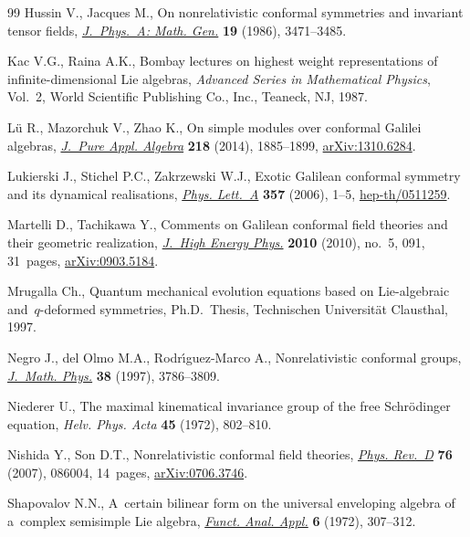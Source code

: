 \documentclass[pdftex]{sigma}
\numberwithin{equation}{section}
\begin{document}
\begin{thebibliography}{99}
Hussin V., Jacques M., On nonrelativistic conformal symmetries and invariant tensor f\/ields,
\href{http://dx.doi.org/10.1088/0305-4470/19/17/014}{\textit{J.~Phys.~A: Math. Gen.}} \textbf{19} (1986), 3471--3485.

Kac V.G., Raina A.K., Bombay lectures on highest weight representations of inf\/inite-dimensional {L}ie algebras,
\textit{Advanced Series in Mathematical Physics}, Vol.~2, World Scientif\/ic Publishing Co., Inc., Teaneck, NJ, 1987.

L{\"u} R., Mazorchuk V., Zhao K., On simple modules over conformal {G}alilei algebras,
\href{http://dx.doi.org/10.1016/j.jpaa.2014.02.012}{\textit{J.~Pure Appl. Algebra}} \textbf{218} (2014), 1885--1899, \href{http://arxiv.org/abs/1310.6284}{arXiv:1310.6284}.

Lukierski J., Stichel P.C., Zakrzewski W.J., Exotic {G}alilean conformal symmetry and its dynamical realisations,
\href{http://dx.doi.org/10.1016/j.physleta.2006.04.016}{\textit{Phys. Lett.~A}} \textbf{357} (2006), 1--5, \href{http://arxiv.org/abs/hep-th/0511259}{hep-th/0511259}.

Martelli D., Tachikawa Y., Comments on {G}alilean conformal f\/ield theories and their geometric realization,
\href{http://dx.doi.org/10.1007/JHEP05(2010)091}{\textit{J.~High Energy Phys.}} \textbf{2010} (2010), no.~5, 091,
31~pages, \href{http://arxiv.org/abs/0903.5184}{arXiv:0903.5184}.

Mrugalla Ch., Quantum mechanical evolution equations based on Lie-algebraic and~$q$-deformed symmetries, Ph.D.~Thesis,
Technischen Universit\"at Clausthal, 1997.

Negro J., del Olmo M.A., Rodr{\'{\i}}guez-Marco A., Nonrelativistic conformal groups,
\href{http://dx.doi.org/10.1063/1.532067}{\textit{J.~Math. Phys.}} \textbf{38} (1997), 3786--3809.

Niederer U., The maximal kinematical invariance group of the free {S}chr\"odinger equation, \textit{Helv. Phys. Acta} \textbf{45} (1972), 802--810.

Nishida Y., Son D.T., Nonrelativistic conformal f\/ield theories,
\href{http://dx.doi.org/10.1103/PhysRevD.76.086004}{\textit{Phys. Rev.~D}} \textbf{76} (2007), 086004, 14~pages, \href{http://arxiv.org/abs/0706.3746}{arXiv:0706.3746}.

Shapovalov N.N., A~certain bilinear form on the universal enveloping algebra of a~complex semisimple {L}ie algebra,
\href{http://dx.doi.org/10.1007/BF01077650}{\textit{Funct. Anal. Appl.}} \textbf{6} (1972), 307--312.


\end{thebibliography}
\end{document}
